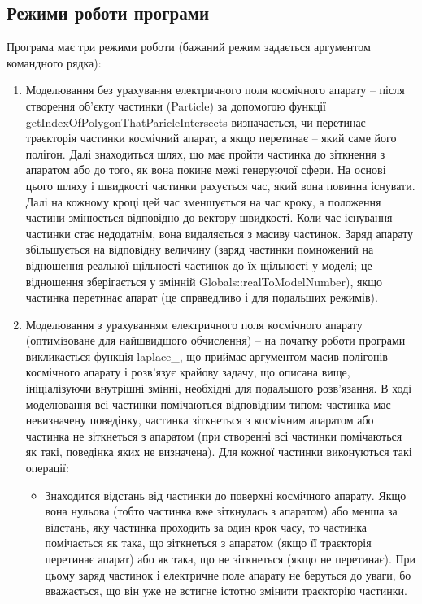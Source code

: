 \documentclass[a4paper,12pt]{article}
\begin{document}
\subsection{Режими роботи програми} \label{sec:modes}
Програма має три режими роботи (бажаний режим задається аргументом командного рядка):
\begin{enumerate}
\item Моделювання без урахування електричного поля космічного апарату -- після створення об’єкту частинки (Particle) за допомогою функції getIndexOfPolygonThatParicleIntersects визначається, чи перетинає траєкторія частинки космічний апарат, а якщо перетинає -- який саме його полігон. Далі знаходиться шлях, що має пройти частинка до зіткнення з апаратом або до того, як вона покине межі генеруючої сфери. На основі цього шляху і швидкості частинки рахується час, який вона повинна існувати. Далі на кожному кроці цей час зменшується на час кроку, а положення частини змінюється відповідно до вектору швидкості. Коли час існування частинки стає недодатнім, вона видаляється з масиву частинок. Заряд апарату збільшується на відповідну величину (заряд частинки помножений на відношення реальної щільності частинок до їх щільності у моделі; це відношення зберігається у змінній Globals::realToModelNumber), якщо частинка перетинає апарат (це справедливо і для подальших режимів).

\item Моделювання з урахуванням електричного поля космічного апарату (оптимізоване для найшвидшого обчислення) -- на початку роботи програми викликається функція laplace\_, що приймає аргументом масив полігонів космічного апарату і розв’язує крайову задачу, що описана вище, ініціалізуючи внутрішні змінні, необхідні для подальшого розв’язання. В ході моделювання всі частинки помічаються відповідним типом: частинка має невизначену поведінку, частинка зіткнеться з космічним апаратом або частинка не зіткнеться з апаратом (при створенні всі частинки помічаються як такі, поведінка яких не визначена). Для кожної частинки виконуються такі операції:

\begin{itemize}
\item Знаходится відстань від частинки до поверхні космічного апарату. Якщо вона нульова (тобто частинка вже зіткнулась з апаратом) або менша за відстань, яку частинка проходить за один крок часу, то частинка помічається як така, що зіткнеться з апаратом (якщо її траєкторія перетинає апарат) або як така, що не зіткнеться (якщо не перетинає). При цьому заряд частинок і електричне поле апарату не беруться до уваги, бо вважається, що він уже не встигне істотно змінити траєкторію частинки.


\end{itemize}
\end{enumerate}
\end{document}
